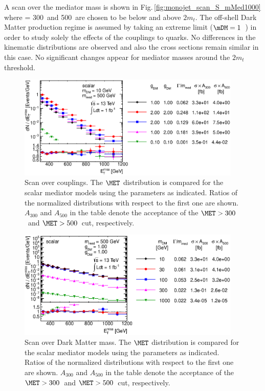 A scan over the mediator mass is shown in Fig.\,\ref{fig:monojet_scan_S_mMed1000} where \mMed = 300~\gev and 500~\gev are chosen to be below and above $2m_t$. The off-shell Dark Matter production regime is assumed by taking an extreme limit ($\mDM=1$~\tev) in order to study solely the effects of the couplings to quarks. 
No differences in the kinematic distributions are observed and also the cross sections remain similar in this case. No significant changes appear for mediator masses around the $2m_t$ threshold.

\begin{figure}[!htpb]
\centering
\includegraphics[width=0.95\textwidth]{figures/monojet/scan_g_S_10_500.eps}
\caption{Scan over couplings. The $\MET$ distribution is compared for the scalar mediator models using the parameters as indicated. Ratios of the normalized distributions with respect to the first one are shown. $A_{300}$ and $A_{500}$ in the table denote the acceptance of the $\MET>300$~\gev and $\MET>500$~\gev cut, respectively.}
\label{fig:monojet_scan_S_g}
\end{figure}

\begin{figure}[!htpb]
\centering
\includegraphics[width=0.95\textwidth]{figures/monojet/scan_mDM_S_500.eps}
\caption{Scan over Dark Matter mass. The $\MET$ distribution is compared for the scalar mediator models using the parameters as indicated. Ratios of the normalized distributions with respect to the first one are shown. $A_{300}$ and $A_{500}$ in the table denote the acceptance of the $\MET>300$~\gev and $\MET>500$~\gev cut, respectively.}
\label{fig:monojet_scan_S_mDM1000}
\end{figure}

